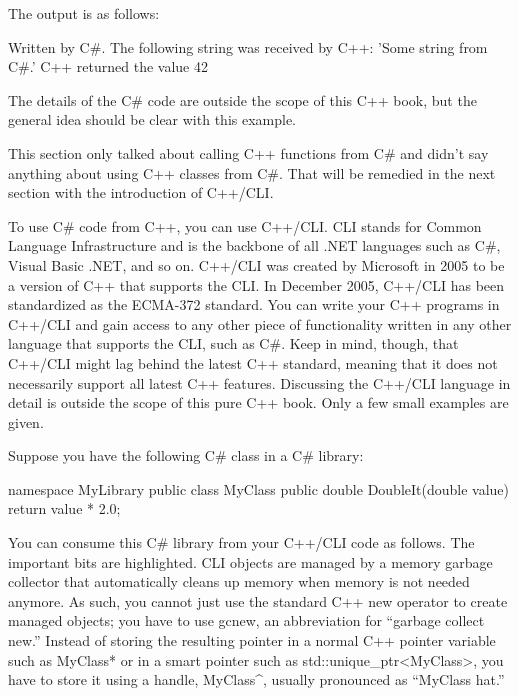 The output is as follows:

\begin{shell}
Written by C#.
The following string was received by C++: 'Some string from C#.'
C++ returned the value 42
\end{shell}

The details of the C\# code are outside the scope of this C++ book, but the general idea should be clear with this example.

This section only talked about calling C++ functions from C\# and didn’t say anything about using C++ classes from C\#. That will be remedied in the next section with the introduction of C++/CLI.


To use C\# code from C++, you can use C++/CLI. CLI stands for Common Language Infrastructure and is the backbone of all .NET languages such as C\#, Visual Basic .NET, and so on. C++/CLI was created by Microsoft in 2005 to be a version of C++ that supports the CLI. In December 2005, C++/CLI has been standardized as the ECMA-372 standard. You can write your C++ programs in C++/CLI and gain access to any other piece of functionality written in any other language that supports the CLI, such as C\#. Keep in mind, though, that C++/CLI might lag behind the latest C++ standard, meaning that it does not necessarily support all latest C++ features. Discussing the C++/CLI language in detail is outside the scope of this pure C++ book. Only a few small examples are given.

Suppose you have the following C\# class in a C\# library:

\begin{cpp}
namespace MyLibrary
{
    public class MyClass
    {
        public double DoubleIt(double value) { return value * 2.0; }
    }
}
\end{cpp}

You can consume this C\# library from your C++/CLI code as follows. The important bits are highlighted. CLI objects are managed by a memory garbage collector that automatically cleans up memory when memory is not needed anymore. As such, you cannot just use the standard C++ new operator to create managed objects; you have to use gcnew, an abbreviation for “garbage collect new.” Instead of storing the resulting pointer in a normal C++ pointer variable such as MyClass* or in a smart pointer such as std::unique\_ptr<MyClass>, you have to store it using a handle, MyClass\^{}, usually pronounced as “MyClass hat.”

